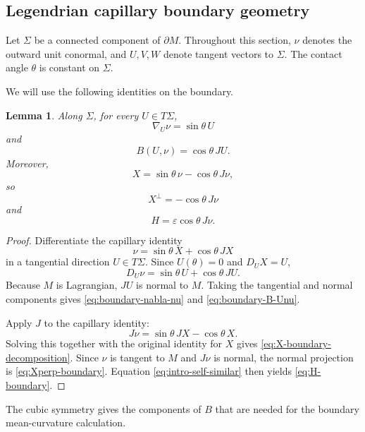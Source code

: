 \documentclass[11pt,a4paper]{article}
\numberwithin{equation}{section}
\newtheorem{lemma}[theorem]{Lemma}
\begin{document}
\subsection{Legendrian capillary boundary geometry}

Let $\Sigma$ be a connected component of $\partial M$.  Throughout this section, $\nu$ denotes the outward unit conormal, and $U,V,W$ denote tangent vectors to $\Sigma$.  The contact angle $\theta$ is constant on $\Sigma$.


We will use the following identities on the boundary.
\begin{lemma}
Along $\Sigma$, for every $U\in T\Sigma$,
\begin{equation}\label{eq:boundary-nabla-nu}
        \nabla_U\nu=\sin\theta\,U
\end{equation}
and
\begin{equation}\label{eq:boundary-B-Unu}
        B(U,\nu)=\cos\theta\,JU.
\end{equation}
Moreover,
\begin{equation}\label{eq:X-boundary-decomposition}
        X=\sin\theta\,\nu-\cos\theta\,J\nu,
\end{equation}
so
\begin{equation}\label{eq:Xperp-boundary}
        X^\perp=-\cos\theta\,J\nu
\end{equation}
and
\begin{equation}\label{eq:H-boundary}
        H=\varepsilon\cos\theta\,J\nu.
\end{equation}
\end{lemma}

\begin{proof}
Differentiate the capillary identity
$$
        \nu=\sin\theta\,X+\cos\theta\,JX
$$
in a tangential direction $U\in T\Sigma$.  Since $U(\theta)=0$ and $D_UX=U$,
$$
        D_U\nu=\sin\theta\,U+\cos\theta\,JU.
$$
Because $M$ is Lagrangian, $JU$ is normal to $M$.  Taking the tangential and normal components gives \eqref{eq:boundary-nabla-nu} and \eqref{eq:boundary-B-Unu}.

Apply $J$ to the capillary identity:
$$
        J\nu=\sin\theta\,JX-\cos\theta\,X.
$$
Solving this together with the original identity for $X$ gives \eqref{eq:X-boundary-decomposition}.  Since $\nu$ is tangent to $M$ and $J\nu$ is normal, the normal projection is \eqref{eq:Xperp-boundary}.  Equation \eqref{eq:intro-self-similar} then yields \eqref{eq:H-boundary}.
\end{proof}

The cubic symmetry gives the components of $B$ that are needed for the boundary mean-curvature calculation.
\end{document}
